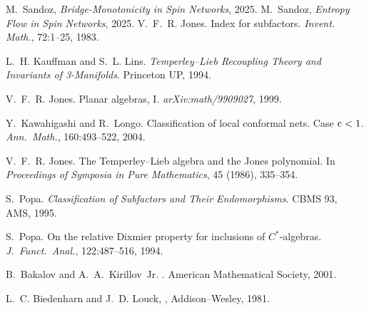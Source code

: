\documentclass[11pt]{article}
\begin{document}

\begin{thebibliography}{9}
 M.~Sandoz, \emph{Bridge-Monotonicity in Spin Networks}, 2025.
 M.~Sandoz, \emph{Entropy Flow in Spin Networks}, 2025.
V.~F.~R. Jones.
\newblock Index for subfactors.
\newblock \emph{Invent. Math.}, 72:1–25, 1983.

L.~H. Kauffman and S.~L. Lins.
\newblock \emph{Temperley–Lieb Recoupling Theory and Invariants of 3-Manifolds}.
\newblock Princeton UP, 1994.

V.~F.~R. Jones.
\newblock Planar algebras, I.
\newblock \emph{arXiv:math/9909027}, 1999.

Y.~Kawahigashi and R.~Longo.
\newblock Classification of local conformal nets.  Case ${\rm c}<1$.
\newblock \emph{Ann.\ Math.}, 160:493–522, 2004.

V.~F.~R. Jones.
\newblock The Temperley–Lieb algebra and the Jones polynomial.
\newblock In \emph{Proceedings of Symposia in Pure Mathematics}, 45 (1986), 335–354.

S.~Popa.
\newblock \emph{Classification of Subfactors and Their Endomorphisms}.
\newblock CBMS 93, AMS, 1995.

S.~Popa.
\newblock On the relative Dixmier property for inclusions of $C^{\ast}$‐algebras.
\newblock \emph{J.\ Funct.\ Anal.}, 122:487–516, 1994.

  B.~Bakalov and A.~A.~Kirillov~Jr.
  .
  \newblock American Mathematical Society, 2001.

L.~C. Biedenharn and J.~D. Louck,
,
\newblock Addison–Wesley, 1981.
  
\end{thebibliography}
\end{document}
